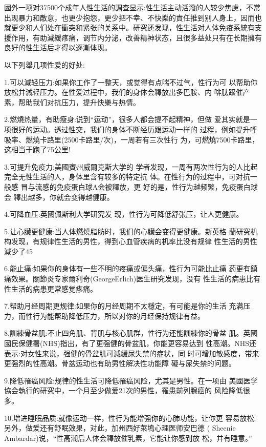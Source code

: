 \documentclass[12pt,UTF8]{ctexbook}
\begin{document}
國外一项对37500个成年人性生活的調查显示:性生活主动活潑的人较少焦慮，不常出现暴力和敵意，也更少抱怨，更少把不幸、不快樂的責任推到别人身上，因而也就更少和人们处在衝突和紧张的关系中。研究还发现，性生活对人体免疫系統有支援作用，有助減緩疼痛，调节内分泌，改善精神状态，且很多益处只有在长期擁有良好的性生活后才得以逐漸体现。

以下列舉几项性爱的好处:

1.可以減轻压力:如果你工作了一整天，或觉得有点喘不过气，性行为可
以帮助你放松并減轻压力。在性爱过程中，我们的身体会釋放出多巴胺、内
啡肽跟催产素，帮助我们对抗压力，提升快樂与热情。

2.燃燒热量，有助瘦身:说到“运动”，很多人都会提不起精神，但做
爱其实就是一项很好的运动。透过性交，我们的身体不断经历跟运动一样的
过程，例如提升呼吸率、燃燒卡路里(2500卡路里/次)，一周若有三次性行
为，可燃燒7500卡路里，这相当于跑了75公里!

3.可提升免疫力:美國賓州威爾克斯大学的
学者发现，一周有两次性行为的人比起完全无性生活的人，身体里含有较多的特定抗
体。在性行为的过程中，可对抗一般感
冒与流感的免疫蛋白球A会被釋放，更
好的是，性行为越频繁，免疫蛋白球会
釋出越多，你就会变得越健康。

4.可降血压:英國佩斯利大学研究发
现，性行为可降低舒张压，让人更健康。

5.让心臟更健康:当人体燃燒脂肪时，我们的心臟会变得更健康。新英格
蘭研究机构发现，有规律性生活的男性，得到心血管疾病的机率比没有规律
性生活的男性減少了45%

6.能止痛:如果你的身体有一些不明的疼痛或偏头痛，性行为可能比止痛
药更有鎮痛效果。關節炎专家爾利奇(GeorgeErlich)医生研究发现，没有
性生活的病患比有性生活的病患更常感觉疼痛。

7.帮助月经周期更规律:如果你的月经周期不太穩定，有可能是你的生活
充满压力，而性行为能帮助降低压力，所以对你的月经保持规律有益。

8.訓練骨盆肌:不止四角肌、背肌与核心肌群，性行为还能訓練你的骨盆
肌。英國國民保健署(NHS)指出，有了更强健的骨盆肌，你能更容易达到
性高潮。NHS还表示:对女性来说，强健的骨盆肌可減緩尿失禁的症状，同
时可增加敏感度，带来更强烈的性高潮。骨盆运动也有助男性解决性功能障
礙与尿失禁的问题。

9.降低罹癌风险:规律的性生活可降低罹癌风险，尤其是男性。在一项由
美國医学協会執行的研究中，一个月至少做爱21次的男性，罹患前列腺癌的
风险降低很多。

10.增进睡眠品质:就像运动一样，性行为能增强你的心肺功能，让你更
容易放松;另外，做爱还有舒眠效果，对此，加州西好萊塢心理医师安巴德
( Sheenie Ambardar)说，“性高潮后人体会釋放催乳素，它能让你感到放
松，并有睡意。”
\end{document}
